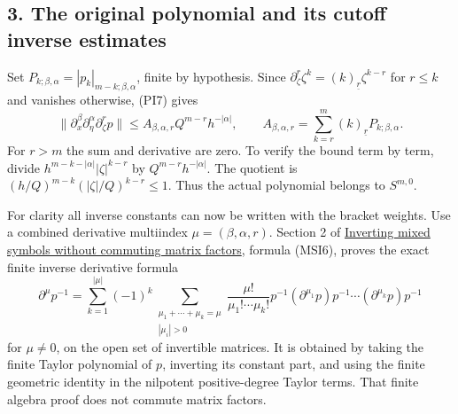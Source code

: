 \documentclass[
  11pt,
]{article}
\makeatletter
\let\ReaderOriginalAnchorStart\hyper@anchorstart
\let\ReaderOriginalAnchorEnd\hyper@anchorend
\let\ReaderPendingAliases\@empty
\def\ReaderArmAliases#1{\gdef\ReaderPendingAliases{#1}}
\def\hyper@anchorstart#1{\ReaderIfNativeAnchorTF{#1}{\ReaderPendingAliases\global\let\ReaderPendingAliases\@empty}{}\ReaderOriginalAnchorStart{#1}}
\makeatother
\begin{document}
\ReaderArmAliases{\ReaderOriginalAnchorStart{AN03-PIN-003}\ReaderOriginalAnchorEnd\begingroup\expandafter\def\csname @currentHref\endcsname{AN03-PIN-003}\label{AN03-PIN-003}\endgroup\ReaderOriginalAnchorStart{an03-pin-003-the-original-polynomial-and-its-cutoff-inverse-estimates}\ReaderOriginalAnchorEnd\begingroup\expandafter\def\csname @currentHref\endcsname{an03-pin-003-the-original-polynomial-and-its-cutoff-inverse-estimates}\label{an03-pin-003-the-original-polynomial-and-its-cutoff-inverse-estimates}\endgroup\ReaderOriginalAnchorStart{3-the-original-polynomial-and-its-cutoff-inverse-estimates}\ReaderOriginalAnchorEnd\begingroup\expandafter\def\csname @currentHref\endcsname{3-the-original-polynomial-and-its-cutoff-inverse-estimates}\label{3-the-original-polynomial-and-its-cutoff-inverse-estimates}\endgroup}
\subsection{3. The original polynomial and its cutoff inverse
estimates}\label{the-original-polynomial-and-its-cutoff-inverse-estimates}

Set \(P_{k;\beta,\alpha}=|p_k|_{m-k;\beta,\alpha}\), finite by
hypothesis. Since
\(\partial_\zeta^r\zeta^k=(k)_{\underline r}\zeta^{k-r}\) for
\(r\leq k\) and vanishes otherwise, (PI7) gives \[
 \|\partial_x^\beta\partial_\eta^\alpha\partial_\zeta^r p\|
 \leq A_{\beta,\alpha,r}Q^{m-r}h^{-|\alpha|},\qquad
 A_{\beta,\alpha,r}
 =\sum_{k=r}^{m}(k)_{\underline r}P_{k;\beta,\alpha}.
 \tag{PI17}
\] For \(r>m\) the sum and derivative are zero. To verify the bound term
by term, divide \(h^{m-k-|\alpha|}|\zeta|^{k-r}\) by
\(Q^{m-r}h^{-|\alpha|}\). The quotient is
\((h/Q)^{m-k}(|\zeta|/Q)^{k-r}\leq1\). Thus the actual polynomial
belongs to \(S^{m,0}\).

For clarity all inverse constants can now be written with the bracket
weights. Use a combined derivative multiindex \(\mu=(\beta,\alpha,r)\).
Section 2 of \href{mixed-symbol-inversion.pdf}{Inverting mixed symbols
without commuting matrix factors}, formula (MSI6), proves the exact
finite inverse derivative formula \[
 \partial^\mu p^{-1}
 =\sum_{k=1}^{|\mu|}(-1)^k
 \sum_{\substack{\mu_1+\cdots+\mu_k=\mu\\|\mu_i|>0}}
 \frac{\mu!}{\mu_1!\cdots\mu_k!}
 p^{-1}(\partial^{\mu_1}p)p^{-1}\cdots
 (\partial^{\mu_k}p)p^{-1}
 \tag{PI18}
\] for \(\mu\ne0\), on the open set of invertible matrices. It is
obtained by taking the finite Taylor polynomial of \(p\), inverting its
constant part, and using the finite geometric identity in the nilpotent
positive-degree Taylor terms. That finite algebra proof does not commute
matrix factors.
\end{document}
